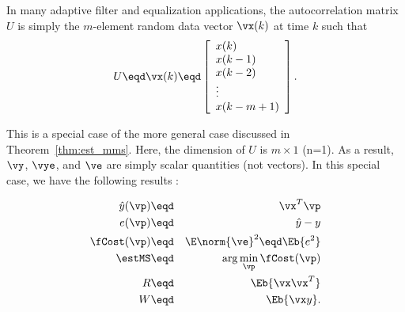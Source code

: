 \begin{example}
In many adaptive filter and equalization applications,
the autocorrelation matrix $U$ is simply the $m$-element
random data vector $\vx(k)$ at time $k$ such that
\[
   U \eqd \vx(k) \eqd
   \left[\begin{array}{l}
      x(k) \\
      x(k-1) \\
      x(k-2) \\
      \vdots \\
      x(k-m+1)
   \end{array}\right].
\]

This is a special case of the more general case discussed
in Theorem~\ref{thm:est_mms}.
Here, the dimension of $U$ is $m\times1$ (n=1).
As a result,
$\vy$, $\vye$, and $\ve$ are simply scalar quantities (not vectors).
In this special case, we have the following results
:

\begin{align*}
   \hat{y}(\vp)   &\eqd& \vx^T \vp    \\
   e(\vp)    &\eqd& \hat{y}-y \\
   \fCost(\vp) &\eqd& \E\norm{\ve}^2 \eqd \Eb{e^2} \\
   \estMS      &\eqd& \arg\min_\vp \fCost(\vp)  \\
   R           &\eqd& \Eb{\vx\vx^T}   \\
   W           &\eqd& \Eb{ \vx y }.
\end{align*}

\end{example}


